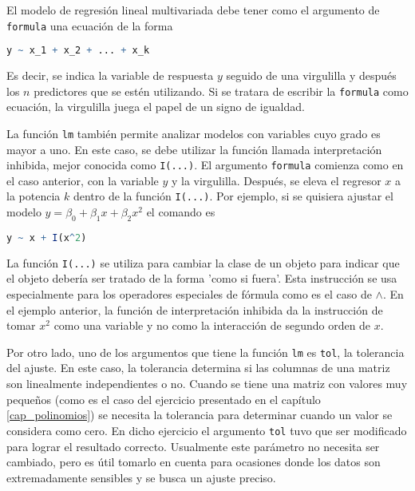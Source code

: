 El modelo de regresión lineal multivariada debe tener como el argumento de \texttt{formula} una ecuación de la forma

\begin{lstlisting}[language=R]
	y ~ x_1 + x_2 + ... + x_k
\end{lstlisting}

Es decir, se indica la variable de respuesta $y$ seguido de una virgulilla y después los $n$ predictores que se estén utilizando. Si se tratara de escribir la \texttt{formula} como ecuación, la virgulilla juega el papel de un signo de igualdad.

La función \texttt{lm} también permite analizar modelos con variables cuyo grado es mayor a uno. En este caso, se debe utilizar la función llamada interpretación inhibida, mejor conocida como \texttt{I(...)}. El argumento \texttt{formula} comienza como en el caso anterior, con la variable $y$ y la virgulilla. Después, se eleva el regresor $x$ a la potencia $k$ dentro de la función \texttt{I(...)}. Por ejemplo, si se quisiera ajustar el modelo  $y = \beta_0 + \beta_1 x + \beta_2 x^{2}$ el comando es

\begin{lstlisting}[language=R]
	y ~ x + I(x^2)
\end{lstlisting}

La función \texttt{I(...)} se utiliza para cambiar la clase de un objeto para indicar que el objeto debería ser tratado de la forma 'como si fuera'. Esta instrucción se usa especialmente para los operadores especiales de fórmula como es el caso de \texttt{$\wedge$}. En el ejemplo anterior, la función de interpretación inhibida da la instrucción de tomar $x^{2}$ como una variable y no como la interacción de segundo orden de $x$. 

Por otro lado, uno de los argumentos que tiene la función \texttt{lm} es \texttt{tol}, la tolerancia del ajuste. En este caso, la tolerancia determina si las columnas de una matriz son linealmente independientes o no. Cuando se tiene una matriz con valores muy pequeños (como es el caso del ejercicio presentado en el capítulo \ref{cap_polinomios}) se necesita la tolerancia para determinar cuando un valor se considera como cero. En dicho ejercicio el argumento \texttt{tol} tuvo que ser modificado para lograr el resultado correcto. Usualmente este parámetro no necesita ser cambiado, pero es útil tomarlo en cuenta para ocasiones donde los datos son extremadamente sensibles y se busca un ajuste preciso. 

